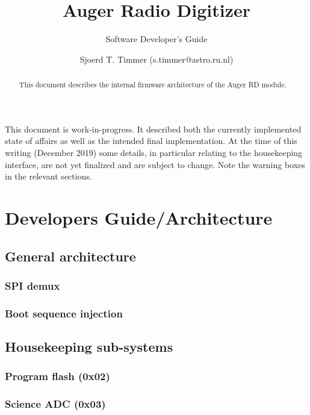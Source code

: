 \documentclass[a4paper,indent]{paper}
\title{Auger Radio Digitizer}
\subtitle{Software Developer's Guide}
\author{%
  Sjoerd T. Timmer (s.timmer@astro.ru.nl)}
\date{}
\begin{document}
\maketitle{}
\begin{abstract}
  This document describes the internal firmware architecture of the Auger \acf{RD} module. \acresetall
\end{abstract}

\begin{mdframed}[linewidth=2pt,linecolor=orange,backgroundcolor=orange!10]%
  This document is work-in-progress.
  It described both the currently implemented state of affairs as well as the intended final implementation.
  At the time of this writing (December 2019) some details, in particular relating to the housekeeping interface, are not yet finalized and are subject to change. Note the warning boxes in the relevant sections. 
\end{mdframed}
  
\tableofcontents

\clearpage


\section{Developers Guide/Architecture}
\subsection{General architecture}
\subsubsection{\acs{SPI} demux}

\subsubsection{Boot sequence injection}


\subsection{Housekeeping sub-systems}

\subsubsection{Program flash (0x02)}

\subsubsection{Science \acs{ADC} (0x03)}
\end{document}
